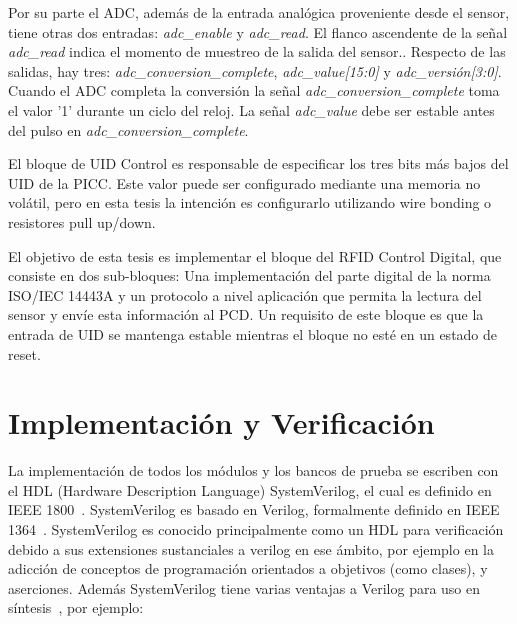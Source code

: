 \documentclass[a4paper, twoside, 11pt]{report}
\begin{document}
Por su parte el ADC, además de la entrada analógica proveniente desde el sensor, tiene otras dos entradas: \textit{adc\_enable} y \textit{adc\_read}. El flanco ascendente de la señal \textit{adc\_read} indica el momento de muestreo de la salida del sensor.. Respecto de las salidas, hay tres: \textit{adc\_conversion\_complete}, \textit{adc\_value[15:0]} y \textit{adc\_versión[3:0]}. Cuando el ADC completa la conversión la señal \textit{adc\_conversion\_complete} toma el valor '1' durante un ciclo del reloj. La señal \textit{adc\_value} debe ser estable antes del pulso en \textit{adc\_conversion\_complete}.

El bloque de UID Control es responsable de especificar los tres bits más bajos del UID de la PICC. Este valor puede ser configurado mediante una memoria no volátil, pero en esta tesis la intención es configurarlo utilizando wire bonding o resistores pull up/down.

El objetivo de esta tesis es implementar el bloque del RFID Control Digital, que consiste en dos sub-bloques: Una implementación del parte digital de la norma ISO/IEC 14443A y un protocolo a nivel aplicación que permita la lectura del sensor y envíe esta información al PCD. Un requisito de este bloque es que la entrada de UID se mantenga estable mientras el bloque no esté en un estado de reset.


\FloatBarrier
\chapter{Implementación y Verificación}

La implementación de todos los módulos y los bancos de prueba se escriben con el HDL (Hardware Description Language) SystemVerilog, el cual  es definido en IEEE 1800~\cite{ieee1800}. SystemVerilog es basado en Verilog,  formalmente definido en IEEE 1364~\cite{ieee1364}. SystemVerilog es conocido principalmente como un HDL para verificación debido a sus extensiones sustanciales a verilog en ese ámbito, por ejemplo en la adicción de conceptos de programación orientados a objetivos (como clases), y aserciones. Además SystemVerilog tiene varias ventajas a Verilog para uso en síntesis~\cite{synthesisable_sv}, por ejemplo:
\end{document}
